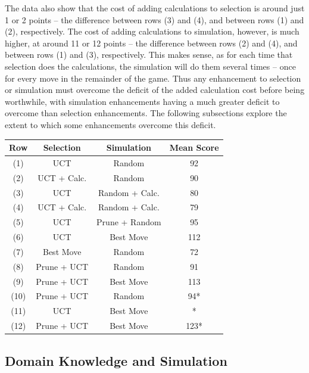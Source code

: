 \documentclass[letterpaper]{article}
\begin{document}
The data also show that the cost of adding calculations to selection is around just 1 or 2 points -- the difference between rows (3) and (4), and between rows (1) and (2), respectively. The cost of adding calculations to simulation, however, is much higher, at around 11 or 12 points -- the difference between rows (2) and (4), and between rows (1) and (3), respectively. This makes sense, as for each time that selection does the calculations, the simulation will do them several times -- once for every move in the remainder of the game. Thus any enhancement to selection or simulation must overcome the deficit of the added calculation cost before being worthwhile, with simulation enhancements having a much greater deficit to overcome than selection enhancements. The following subsections explore the extent to which some enhancements overcome this deficit.

\begin{table}
\label{tbl:SelSim}
\centering
\begin{tabular}{c c c c}
\hline
{\bf Row} & {\bf Selection} & {\bf Simulation} & {\bf Mean Score} \\
\hline
\hline
(1) & UCT & Random & 92 \\
(2) & UCT + Calc. & Random & 90 \\
(3) & UCT & Random + Calc. & 80 \\
(4) & UCT + Calc. & Random + Calc. & 79 \\
\hline
(5) & UCT & Prune + Random & 95 \\
(6) & UCT & Best Move & 112 \\
\hline
(7) & Best Move & Random & 72 \\
(8) & Prune + UCT & Random & 91 \\
\hline
(9) & Prune + UCT & Best Move & 113 \\
\hline
(10) & Prune + UCT & Random & 94\mbox{*}  \\
(11) & UCT & Best Move & \mbox{*} \\
(12) & Prune + UCT & Best Move & 123\mbox{*}  \\
\end{tabular}
\end{table}

\subsection{Domain Knowledge and Simulation}
\end{document}
